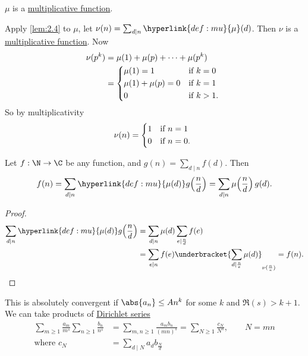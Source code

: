 \documentclass{article}
\begin{document}
\begin{ex}
    \hyperlink{def:mu}{$\mu$} is a \hyperlink{def:multiplicativeFunction}{multiplicative function}.
\end{ex}
Apply \cref{lem:2.4} to $\mu$, let $\nu(n) = \sum_{d \mid n} \hyperlink{def:mu}{\mu}(d)$.
Then $\nu$ is a \hyperlink{def:multiplicativeFunction}{multiplicative function}.  Now
\begin{align*}
    \nu(p^k) &= \mu(1) + \mu(p) + \dotsb + \mu(p^k) \\
             &=
    \begin{cases*}
        \mu(1) = 1 & if $k=0$ \\
        \mu(1) + \mu(p) = 0 & if $k=1$ \\
        0 & if $k>1$.
    \end{cases*}
\end{align*}
So by multiplicativity
\begin{equation*}
    \nu(n) =
    \begin{cases*}
        1 & if $n = 1$ \\
        0 & if $n = 0$.
    \end{cases*}
\end{equation*}

\begin{nprop}\label{prop:5.6}
    Let $f: \N \to \C$ be any function, and $g(n) = \sum_{d \mid n} f(d)$.
    Then
    \begin{equation*}
        f(n) = \sum_{d \mid n} \hyperlink{def:mu}{\mu(d)} g\!\left(\frac{n}{d}\right) = \sum_{d \mid n} \mu\!\left(\frac{n}{d}\right) g(d).
    \end{equation*}
\end{nprop}

\begin{proof}
    \begin{align*}
        \sum_{d \mid n} \hyperlink{def:mu}{\mu(d)} g\!\left(\frac{n}{d}\right) &= \sum_{d \mid n} \mu(d) \sum_{e \mid \frac{n}{d}} f(e) \\
                                              &= \sum_{e \mid n} f(e) \underbracket{\sum_{d \mid \frac{n}{e}} \mu(d)}_{\nu(\frac{n}{e})} = f(n). \qedhere
    \end{align*}
\end{proof}

This is absolutely convergent if $\abs{a_n} \leq A n^k$ for some $k$ and $\Re(s) > k+1$.
We can take products of \hyperlink{def:dirichlet}{Dirichlet series}
\begin{align*}
    \sum_{m \geq 1} \frac{a_m}{m^s} \sum_{n \geq 1} \frac{b_n}{n^s} &= \sum_{m,n\geq 1} \frac{a_m b_n}{(mn)^s} = \sum_{N \geq 1} \frac{c_N}{N^s}, \qquad N=mn \\
    \text{where } c_N &= \sum_{d \mid N} a_d b_{\frac{N}{d}}
\end{align*}
\end{document}
